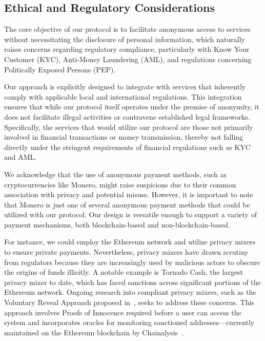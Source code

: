 \documentclass[pdftex,twocolumn,epjc3]{svjour3}
\begin{document}
\subsection{Ethical and Regulatory Considerations}

The core objective of our protocol is to facilitate anonymous access to services without necessitating the disclosure of personal information, which naturally raises concerns regarding regulatory compliance, particularly with Know Your Customer (KYC), Anti-Money Laundering (AML), and regulations concerning Politically Exposed Persons (PEP).

Our approach is explicitly designed to integrate with services that inherently comply with applicable local and international regulations. This integration ensures that while our protocol itself operates under the premise of anonymity, it does not facilitate illegal activities or contravene established legal frameworks. Specifically, the services that would utilize our protocol are those not primarily involved in financial transactions or money transmission, thereby not falling directly under the stringent requirements of financial regulations such as KYC and AML.

We acknowledge that the use of anonymous payment methods, such as cryptocurrencies like Monero, might raise suspicions due to their common association with privacy and potential misuse. However, it is important to note that Monero is just one of several anonymous payment methods that could be utilized with our protocol. Our design is versatile enough to support a variety of payment mechanisms, both blockchain-based and non-blockchain-based.

\begin{sloppypar}
For instance, we could employ the Ethereum network and utilize privacy mixers to ensure private payments. Nevertheless, privacy mixers have drawn scrutiny from regulators because they are increasingly used by malicious actors to obscure the origins of funds illicitly. A notable example is Tornado Cash, the largest privacy mixer to date, which has faced sanctions across significant portions of the Ethereum network. Ongoing research into compliant privacy mixers, such as the Voluntary Reveal Approach proposed in~\cite{dotanHazeCompliantPrivacy2023}, seeks to address these concerns. This approach involves Proofs of Innocence required before a user can access the system and incorporates oracles for monitoring sanctioned addresses—currently maintained on the Ethereum blockchain by Chainalysis~\cite{ChainalysisOracleSanctions}.
\end{sloppypar}
\end{document}
